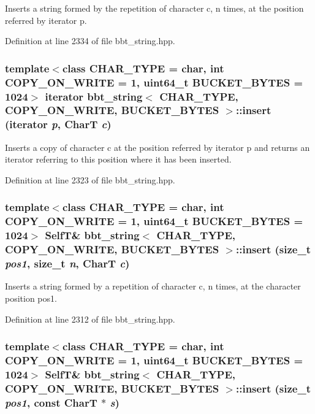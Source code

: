 Inserts a string formed by the repetition of character c, n times, at the position referred by iterator p. 

Definition at line 2334 of file bbt\_\-string.hpp.\hypertarget{classbbt__string_5eb3ddd3247398965c17324150398664}{
\subsubsection[{insert}]{\setlength{\rightskip}{0pt plus 5cm}template$<$class CHAR\_\-TYPE  = char, int COPY\_\-ON\_\-WRITE = 1, uint64\_\-t BUCKET\_\-BYTES = 1024$>$ iterator {\bf bbt\_\-string}$<$ CHAR\_\-TYPE, COPY\_\-ON\_\-WRITE, BUCKET\_\-BYTES $>$::insert (iterator {\em p}, \/  CharT {\em c})}}
\label{classbbt__string_5eb3ddd3247398965c17324150398664}


Inserts a copy of character c at the position referred by iterator p and returns an iterator referring to this position where it has been inserted. 

Definition at line 2323 of file bbt\_\-string.hpp.\hypertarget{classbbt__string_414570f2f7f3afe8b105805a04f83e76}{
\subsubsection[{insert}]{\setlength{\rightskip}{0pt plus 5cm}template$<$class CHAR\_\-TYPE  = char, int COPY\_\-ON\_\-WRITE = 1, uint64\_\-t BUCKET\_\-BYTES = 1024$>$ {\bf SelfT}\& {\bf bbt\_\-string}$<$ CHAR\_\-TYPE, COPY\_\-ON\_\-WRITE, BUCKET\_\-BYTES $>$::insert (size\_\-t {\em pos1}, \/  size\_\-t {\em n}, \/  CharT {\em c})}}
\label{classbbt__string_414570f2f7f3afe8b105805a04f83e76}


Inserts a string formed by a repetition of character c, n times, at the character position pos1. 

Definition at line 2312 of file bbt\_\-string.hpp.\hypertarget{classbbt__string_3f5e4d3bbea5d9d55fe9fcb3185b7919}{
\subsubsection[{insert}]{\setlength{\rightskip}{0pt plus 5cm}template$<$class CHAR\_\-TYPE  = char, int COPY\_\-ON\_\-WRITE = 1, uint64\_\-t BUCKET\_\-BYTES = 1024$>$ {\bf SelfT}\& {\bf bbt\_\-string}$<$ CHAR\_\-TYPE, COPY\_\-ON\_\-WRITE, BUCKET\_\-BYTES $>$::insert (size\_\-t {\em pos1}, \/  const CharT $\ast$ {\em s})}}
\label{classbbt__string_3f5e4d3bbea5d9d55fe9fcb3185b7919}


